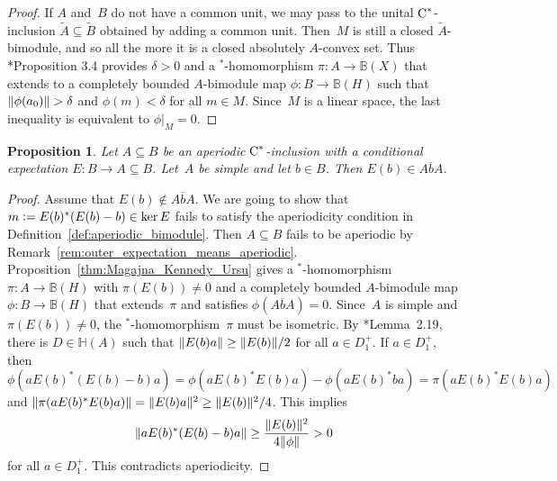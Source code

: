 \documentclass[a4paper]{amsart}
\theoremstyle{plain}
\newtheorem{proposition}[theorem]{Proposition}
\theoremstyle{definition}
\theoremstyle{remark}
\numberwithin{theorem}{section}
\numberwithin{equation}{section}
\newcommand{\Her}{\mathbb H}%
\newcommand*{\nb}{\nobreakdash}
\newcommand*{\Star}{\(^*\)\nobreakdash-}
\newcommand*{\Bound}{\mathbb B}%
\newcommand*{\Cst}{\textup C^*}%
\newcommand*{\defeq}{\mathrel{\vcentcolon=}}%
\DeclarePairedDelimiter{\norm}{\lVert}{\rVert}%
\begin{document}
\begin{proof}
  If \(A\) and~\(B\) do not have a common unit, we may pass to the
  unital \(\Cst\)\nb-inclusion \(\widetilde{A}\subseteq
  \widetilde{B}\) obtained by adding a common unit.
  Then~\(M\) is still a closed \(\widetilde{A}\)\nb-bimodule, and so
  all the more it is a closed absolutely \(A\)\nb-convex set.
  Thus
  \cite{Kennedy-Ursu:Intermediate_subalgebras_crossed}*{Proposition
    3.4} provides \(\delta>0\) and a \Star{}homomorphism \(\pi\colon
  A\to \Bound(X)\) that extends to a completely bounded
  \(A\)\nb-bimodule map \(\phi\colon B\to \Bound(H)\) such that
  \(\norm{\phi(a_0)}> \delta\) and \(\phi(m)<\delta\) for all \(m\in
  M\).
  Since~\(M\) is a linear space, the last inequality is equivalent to
  \(\phi|_M=0\).
\end{proof}

\begin{proposition}
  \label{prop:module_approximation}
  Let \(A\subseteq B\) be an aperiodic \(\Cst\)\nb-inclusion with a
  conditional expectation \(E\colon B\to A\subseteq B\).
  Let~\(A\) be simple and let \(b\in B\).
  Then \(E(b)\in \overline{AbA}\).
\end{proposition}

\begin{proof}
  Assume that \(E(b)\notin \overline{AbA}\).
  We are going to show that \(m\defeq E(b)^*(E(b)-b)\in \ker E\) fails
  to satisfy the aperiodicity condition in
  Definition~\ref{def:aperiodic_bimodule}.
  Then \(A\subseteq B\) fails to be aperiodic by
  Remark~\ref{rem:outer_expectation_means_aperiodic}.
  Proposition~\ref{thm:Magajna_Kennedy_Ursu} gives a
  \Star{}homomorphism \(\pi\colon A\to \Bound(H)\) with
  \(\pi(E(b))\neq0\) and a completely bounded \(A\)\nb-bimodule map
  \(\phi\colon B\to \Bound(H)\) that extends~\(\pi\) and satisfies
  \(\phi(\overline{AbA})=0\).
  Since~\(A\) is simple and \(\pi(E(b))\neq0\), the
  \Star{}homomorphism~\(\pi\) must be isometric.
  By \cite{Kwasniewski-Meyer:Aperiodicity}*{Lemma~2.19}, there is
  \(D\in \Her(A)\) such that \(\norm{E(b)a}\ge \norm{E(b)}/2\) for
  all \(a\in D^+_1\).
  If \(a\in D^+_1\), then
  \[
    \phi(aE(b)^*(E(b)-b)a)
    = \phi(aE(b)^* E(b)a)-\phi(aE(b)^*ba)=\pi(aE(b)^* E(b)a)
  \]
  and \(\norm{\pi(aE(b)^* E(b)a)}=\norm{E(b)a}^2\ge
  \norm{E(b)}^2/4\).
  This implies
  \[
    \norm{aE(b)^*(E(b)-b)a}\ge  \frac{\norm{E(b)}^2}{4\norm{\phi}}>0
  \]
  for all \(a\in D_1^+\).
  This contradicts aperiodicity.
\end{proof}
\end{document}
